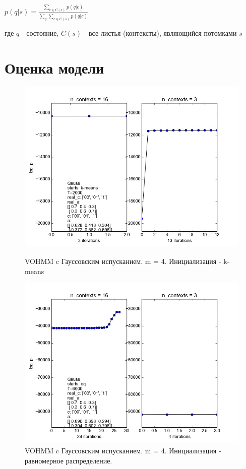 \documentclass[10pt,a4paper]{article}
\begin{document}
$ p(q|s) = \frac{\sum_{c \in C(s)} {p(q|c)}}{\sum_q\sum_{c \in C(s)} {p(q|c)}} $ 

где $ q $ - состояние, $ C(s )$ - все листья (контексты), являющийся потомками $ s $




\section{Оценка модели}


\begin{figure}[ht]\centering
	\parbox[b]{ 0.49 \textwidth}{
	\includegraphics[scale=0.3]{img/gauss_3.jpg}
	\centering
	\caption{VOHMM c Гауссовским испусканием. m = 4. Инициализация - k-means}
	\label{ris:img_Gauss_3}
	
	}
\hfil \hfil%
\begin{minipage}[b]{0.49 \textwidth}
	\includegraphics[scale=0.3]{img/gauss_eq_3.jpg}
	\centering
	\caption{VOHMM c Гауссовским испусканием. m =  4. Инициализация - равномерное распределение.}
	\label{ris:img_Gauss_eq_3}
\end{minipage}
\end{figure}
\end{document}
